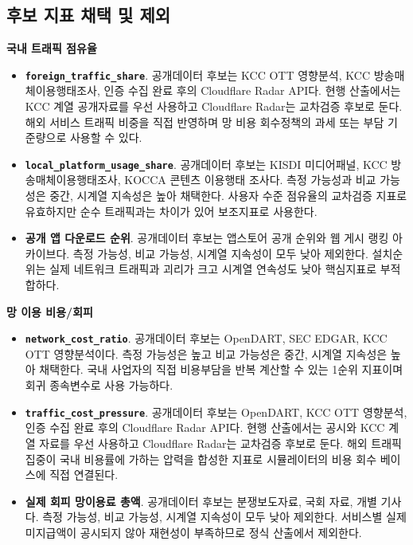 \documentclass[11pt,a4paper]{report}
\newenvironment{summarylist}{\begin{itemize}[leftmargin=1.8em,itemsep=0.35em,topsep=0.35em]\RaggedRight}{\end{itemize}}
\begin{document}
\subsection{후보 지표 채택 및 제외}
\begingroup
\footnotesize
\noindent\textbf{국내 트래픽 점유율}
\begin{summarylist}
  \item \textbf{\texttt{foreign\_traffic\_share}}. 공개데이터 후보는 KCC OTT 영향분석, KCC 방송매체이용행태조사, 인증 수집 완료 후의 Cloudflare Radar API다. 현행 산출에서는 KCC 계열 공개자료를 우선 사용하고 Cloudflare Radar는 교차검증 후보로 둔다. 해외 서비스 트래픽 비중을 직접 반영하며 망 비용 회수정책의 과세 또는 부담 기준량으로 사용할 수 있다.
  \item \textbf{\nolinkurl{local_platform_usage_share}}. 공개데이터 후보는 KISDI 미디어패널, KCC 방송매체이용행태조사, KOCCA 콘텐츠 이용행태 조사다. 측정 가능성과 비교 가능성은 중간, 시계열 지속성은 높아 채택한다. 사용자 수준 점유율의 교차검증 지표로 유효하지만 순수 트래픽과는 차이가 있어 보조지표로 사용한다.
  \item \textbf{공개 앱 다운로드 순위}. 공개데이터 후보는 앱스토어 공개 순위와 웹 게시 랭킹 아카이브다. 측정 가능성, 비교 가능성, 시계열 지속성이 모두 낮아 제외한다. 설치순위는 실제 네트워크 트래픽과 괴리가 크고 시계열 연속성도 낮아 핵심지표로 부적합하다.
\end{summarylist}

\noindent\textbf{망 이용 비용/회피}
\begin{summarylist}
  \item \textbf{\texttt{network\_cost\_ratio}}. 공개데이터 후보는 OpenDART, SEC EDGAR, KCC OTT 영향분석이다. 측정 가능성은 높고 비교 가능성은 중간, 시계열 지속성은 높아 채택한다. 국내 사업자의 직접 비용부담을 반복 계산할 수 있는 1순위 지표이며 회귀 종속변수로 사용 가능하다.
  \item \textbf{\texttt{traffic\_cost\_pressure}}. 공개데이터 후보는 OpenDART, KCC OTT 영향분석, 인증 수집 완료 후의 Cloudflare Radar API다. 현행 산출에서는 공시와 KCC 계열 자료를 우선 사용하고 Cloudflare Radar는 교차검증 후보로 둔다. 해외 트래픽 집중이 국내 비용률에 가하는 압력을 합성한 지표로 시뮬레이터의 비용 회수 베이스에 직접 연결된다.
  \item \textbf{실제 회피 망이용료 총액}. 공개데이터 후보는 분쟁보도자료, 국회 자료, 개별 기사다. 측정 가능성, 비교 가능성, 시계열 지속성이 모두 낮아 제외한다. 서비스별 실제 미지급액이 공시되지 않아 재현성이 부족하므로 정식 산출에서 제외한다.
\end{summarylist}
\end{document}
